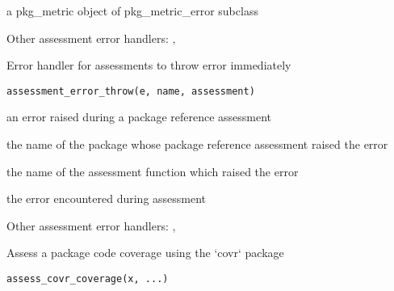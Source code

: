 \documentclass[a4paper]{book}
\begin{document}
%
\begin{Value}
a pkg\_metric object of pkg\_metric\_error subclass
\end{Value}
%
\begin{SeeAlso}
Other assessment error handlers: 
,
\end{SeeAlso}
%
\begin{Description}
Error handler for assessments to throw error immediately
\end{Description}
%
\begin{Usage}
\begin{verbatim}
assessment_error_throw(e, name, assessment)
\end{verbatim}
\end{Usage}
%
\begin{Arguments}
\begin{ldescription}
\item[\code{e}] an error raised during a package reference assessment

\item[\code{name}] the name of the package whose package reference assessment raised
the error

\item[\code{assessment}] the name of the assessment function which raised the error
\end{ldescription}
\end{Arguments}
%
\begin{Value}
the error encountered during assessment
\end{Value}
%
\begin{SeeAlso}
Other assessment error handlers: 
,
\end{SeeAlso}
%
\begin{Description}
Assess a package code coverage using the `covr` package
\end{Description}
%
\begin{Usage}
\begin{verbatim}
assess_covr_coverage(x, ...)
\end{verbatim}
\end{Usage}
\end{document}
